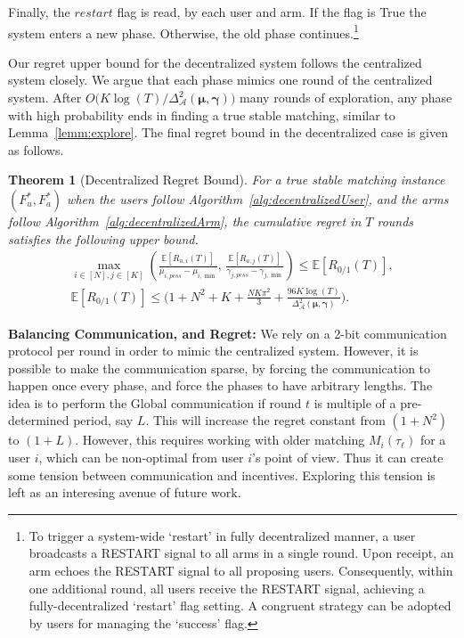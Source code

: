 \documentclass{article}
\newtheorem{theorem}{Theorem}[section]
\begin{document}
Finally, the $restart$ flag is read, by each user and arm. If the flag is True the system enters a new phase. Otherwise, the old phase continues.\footnote{To trigger a system-wide `restart' in fully decentralized manner, a user broadcasts a RESTART signal to all arms in a single round. Upon receipt, an arm echoes the RESTART signal to all proposing users. Consequently, within one additional round, all users receive the RESTART signal, achieving a fully-decentralized `restart' flag setting. A congruent strategy can be adopted by users for managing the `success' flag.}

Our regret upper bound for the decentralized system follows the centralized system closely. We argue that each phase mimics one round of the centralized system.  After $O\big(K\log(T) / \Delta_{\mathcal{A}}^2(\boldsymbol{\mu}, \boldsymbol{\gamma})\big)$ many rounds of exploration, any phase with high probability ends in finding a true stable matching, similar to Lemma~\ref{lemm:explore}. The final regret bound in the decentralized case is given as follows.


\begin{theorem}[Decentralized Regret Bound]
\label{thm:decentralized_main}
     For a true stable matching instance $(F^*_{u}, F^*_{a})$ when the users follow Algorithm~\ref{alg:decentralizedUser}, and the arms follow Algorithm~\ref{alg:decentralizedArm}, the cumulative regret in $T$ rounds  satisfies the following upper bound. 
    \begin{gather*}
     \max_{i \in [N], j \in [K]}\left(\tfrac{\mathbb{E}[R_{u,i}(T)]}{\mu_{i,pess} - \mu_{i, \min}},\, \tfrac{\mathbb{E}[R_{a,j}(T)]}{\gamma_{j,pess} - \gamma_{j, \min}}\right) \leq \mathbb{E}[R_{0/1}(T)],\\
     \mathbb{E}[R_{0/1}(T)] \leq  
     \Big(1 + N^2 + K + \frac{NK \pi^2}{3} +  \frac{96 K\log(T)}{\Delta^2_{\mathcal{A}}(\boldsymbol{\mu}, \boldsymbol{\gamma})}\Big).
    \end{gather*}
\end{theorem}

\textbf{Balancing Communication, and Regret:} We rely on a 2-bit communication protocol per round in order to mimic the centralized system. However, it is possible to make the communication sparse, by forcing the communication to happen once every phase, and force the phases to have arbitrary lengths. The idea is to  perform the Global communication if round $t$ is multiple of a pre-determined period, say $L$. This will increase the regret constant from $(1+ N^2)$ to $(1 + L)$. However, this requires working with older matching $M_i(\tau_{\ell})$ for a user $i$, which can be non-optimal from user $i$'s point of view. Thus it can create some tension between communication and incentives. Exploring this tension is left as an interesing avenue of future work. 
\end{document}
